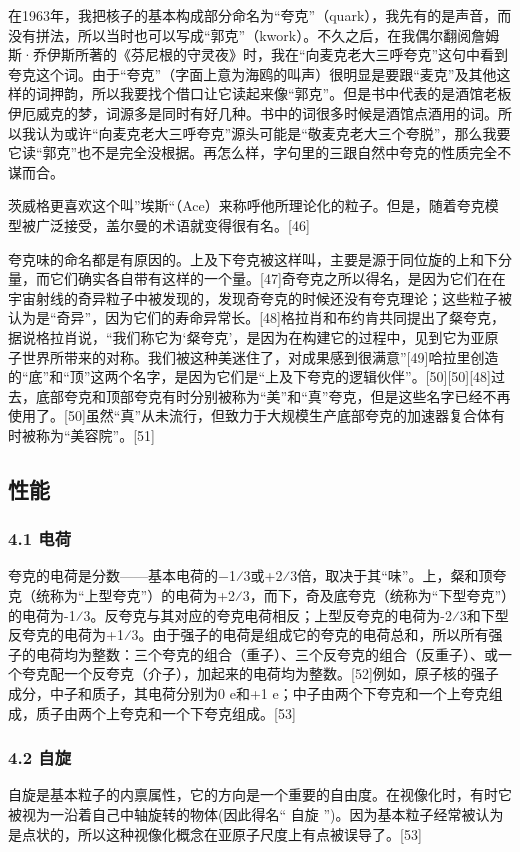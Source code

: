 在1963年，我把核子的基本构成部分命名为“夸克”（quark），我先有的是声音，而没有拼法，所以当时也可以写成“郭克”（kwork）。不久之后，在我偶尔翻阅詹姆斯·乔伊斯所著的《芬尼根的守灵夜》时，我在“向麦克老大三呼夸克”这句中看到夸克这个词。由于“夸克”（字面上意为海鸥的叫声）很明显是要跟“麦克”及其他这样的词押韵，所以我要找个借口让它读起来像“郭克”。但是书中代表的是酒馆老板伊厄威克的梦，词源多是同时有好几种。书中的词很多时候是酒馆点酒用的词。所以我认为或许“向麦克老大三呼夸克”源头可能是“敬麦克老大三个夸脱”，那么我要它读“郭克”也不是完全没根据。再怎么样，字句里的三跟自然中夸克的性质完全不谋而合。

茨威格更喜欢这个叫”埃斯“（Ace）来称呼他所理论化的粒子。但是，随着夸克模型被广泛接受，盖尔曼的术语就变得很有名。[46]

夸克味的命名都是有原因的。上及下夸克被这样叫，主要是源于同位旋的上和下分量，而它们确实各自带有这样的一个量。[47]奇夸克之所以得名，是因为它们在在宇宙射线的奇异粒子中被发现的，发现奇夸克的时候还没有夸克理论；这些粒子被认为是“奇异”，因为它们的寿命异常长。[48]格拉肖和布约肯共同提出了粲夸克，据说格拉肖说，“我们称它为‘粲夸克’，是因为在构建它的过程中，见到它为亚原子世界所带来的对称。我们被这种美迷住了，对成果感到很满意”[49]哈拉里创造的“底”和“顶”这两个名字，是因为它们是“上及下夸克的逻辑伙伴”。[50][50][48]过去，底部夸克和顶部夸克有时分别被称为“美”和“真”夸克，但是这些名字已经不再使用了。[50]虽然“真”从未流行，但致力于大规模生产底部夸克的加速器复合体有时被称为“美容院”。[51]

\subsection{性能}
\subsubsection{4.1 电荷}
夸克的电荷是分数——基本电荷的−1⁄3或+2⁄3倍，取决于其“味”。上，粲和顶夸克（统称为“上型夸克”）的电荷为+2⁄3，而下，奇及底夸克（统称为“下型夸克”）的电荷为-1⁄3。反夸克与其对应的夸克电荷相反；上型反夸克的电荷为-2⁄3和下型反夸克的电荷为+1⁄3。由于强子的电荷是组成它的夸克的电荷总和，所以所有强子的电荷均为整数：三个夸克的组合（重子）、三个反夸克的组合（反重子）、或一个夸克配一个反夸克（介子），加起来的电荷均为整数。[52]例如，原子核的强子成分，中子和质子，其电荷分别为0 e和+1 e；中子由两个下夸克和一个上夸克组成，质子由两个上夸克和一个下夸克组成。[53]

\subsubsection{4.2 自旋}
自旋是基本粒子的内禀属性，它的方向是一个重要的自由度。在视像化时，有时它被视为一沿着自己中轴旋转的物体(因此得名“ 自旋 ”)。因为基本粒子经常被认为是点状的，所以这种视像化概念在亚原子尺度上有点被误导了。[53]

